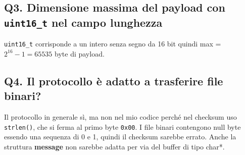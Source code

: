 \documentclass[a4paper,12pt]{article}
\begin{document}
\subsection*{Q3. Dimensione massima del payload con \texttt{uint16\_t} nel campo lunghezza}

\texttt{uint16\_t} corrisponde a un intero senza segno da 16 bit quindi max =
$2^{16}-1 = 65535$ byte di payload.

\subsection*{Q4. Il protocollo è adatto a trasferire file binari?}

Il protocollo in generale sì, ma non nel mio codice perché nel checksum uso
\texttt{strlen()}, che si ferma al primo byte \texttt{0x00}. I file binari contengono
null byte essendo una sequenza di 0 e 1, quindi il checksum sarebbe errato.
Anche la struttura \textbf{message} non sarebbe adatta per via del buffer di
tipo char*.
\end{document}
